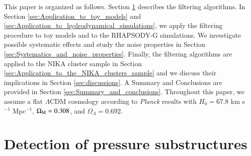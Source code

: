 \documentclass[traditabstract]{aa}
\begin{document}
This paper is organized as follows. Section \ref{sec:Pressure_substructures_detection} describes the filtering algorithms. In Section \ref{sec:Application_to_toy_models} and \ref{sec:Application_to_hydrodynamical_simulations}, we apply the filtering procedure to toy models and to the RHAPSODY-G simulations. We investigate possible systematic effects and study the noise properties in Section \ref{sec:Systematics_and_noise_properties}. Finally, the filtering algorithms are applied to the NIKA cluster sample in Section \ref{sec:Application_to_the_NIKA_clusters_sample} and we discuss their implications in Section \ref{sec:discussions}. A Summary and Conclusions are provided in Section \ref{sec:Summary_and_conclusions}. Throughout this paper, we assume a flat $\Lambda$CDM cosmology according to \textit{Planck} results \citep{Planck2016XIII} with $H_0 = 67.8$ km s$^{-1}$ Mpc$^{-1}$, $\Omega_{\rm M} = 0.308$, and $\Omega_{\Lambda} = 0.692$.

\section{Detection of pressure substructures}\label{sec:Pressure_substructures_detection}
\end{document}
